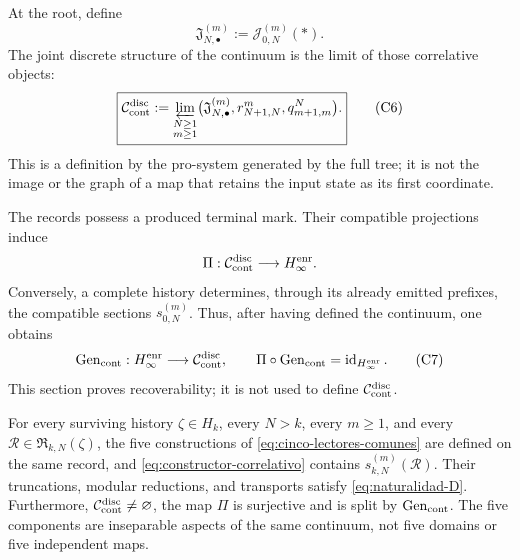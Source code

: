 At the root, define
\[
 \mathfrak J_{N,\bullet}^{(m)}:=\mathcal J_{0,N}^{(m)}(\ast).
\tag{C5}
\label{eq:fibras-conjuntas-horizonte}
\]
The joint discrete structure of the continuum is the limit of those
correlative objects:
\[
 \boxed{
 \mathcal C_{\rm cont}^{\rm disc}
 :=\varprojlim_{\substack{N\geq1\\m\geq1}}
   \bigl(\mathfrak J_{N,\bullet}^{(m)},
         r^m_{N+1,N},q^N_{m+1,m}\bigr).}
\tag{C6}
\label{eq:continuo-discreto}
\]
This is a definition by the pro-system generated by the full tree; it is not
the image or the graph of a map that retains the input state as its
first coordinate.

The records possess a produced terminal mark. Their compatible projections
induce
\[
 \Pi:\mathcal C_{\rm cont}^{\rm disc}\longrightarrow H_\infty^{\rm enr}.
\]
Conversely, a complete history determines, through its already emitted prefixes,
the compatible sections \(s_{0,N}^{(m)}\). Thus, after having
defined the continuum, one obtains
\[
 \operatorname{Gen}_{\rm cont}:H_\infty^{\rm enr}
 \longrightarrow\mathcal C_{\rm cont}^{\rm disc},
 \qquad
 \Pi\circ\operatorname{Gen}_{\rm cont}
 =\operatorname{id}_{H_\infty^{\rm enr}}.
\tag{C7}
\label{eq:seccion-historias-continuo}
\]
This section proves recoverability; it is not used to define
\(\mathcal C_{\rm cont}^{\rm disc}\).

\begin{theorem}
\label{thm:correlacion-cinco}
For every surviving history \(\zeta\in H_k\), every \(N>k\), every
\(m\geq1\), and every \(\mathscr R\in\mathfrak R_{k,N}(\zeta)\), the five
constructions of \eqref{eq:cinco-lectores-comunes} are defined on the
same record, and \eqref{eq:constructor-correlativo} contains
\(s_{k,N}^{(m)}(\mathscr R)\). Their truncations, modular reductions, and
transports satisfy \eqref{eq:naturalidad-D}. Furthermore,
\(\mathcal C_{\rm cont}^{\rm disc}\neq\varnothing\), the map \(\Pi\)
is surjective and is split by \(\operatorname{Gen}_{\rm cont}\). The
five components are inseparable aspects of the same continuum, not five
domains or five independent maps.
\end{theorem}

